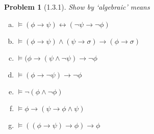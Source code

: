 \documentclass[letter]{article}
\newtheorem{problem}{Problem}
\theoremstyle{definition}
\begin{document}
\begin{problem}[1.3.1] Show by `algebraic' means
 \begin{enumerate}[(a)]
     \item $\models (\phi \to \psi) \leftrightarrow (\neg \psi \to \neg \phi)$
     \item $\models (\phi \to \psi) \land (\psi \to \sigma) \to (\phi \to \sigma)$
     \item $\models (\phi \to (\psi \land \neg \psi) \to \neg \phi$
     \item $\models (\phi \to \neg \psi) \to \neg \phi$
     \item $\models \neg (\phi \land \neg \phi)$
     \item $\models \phi \to (\psi \to \phi \land \psi)$
     \item $\models ((\phi \to \psi) \to \phi) \to \phi$
 \end{enumerate}
\end{problem}
\end{document}
